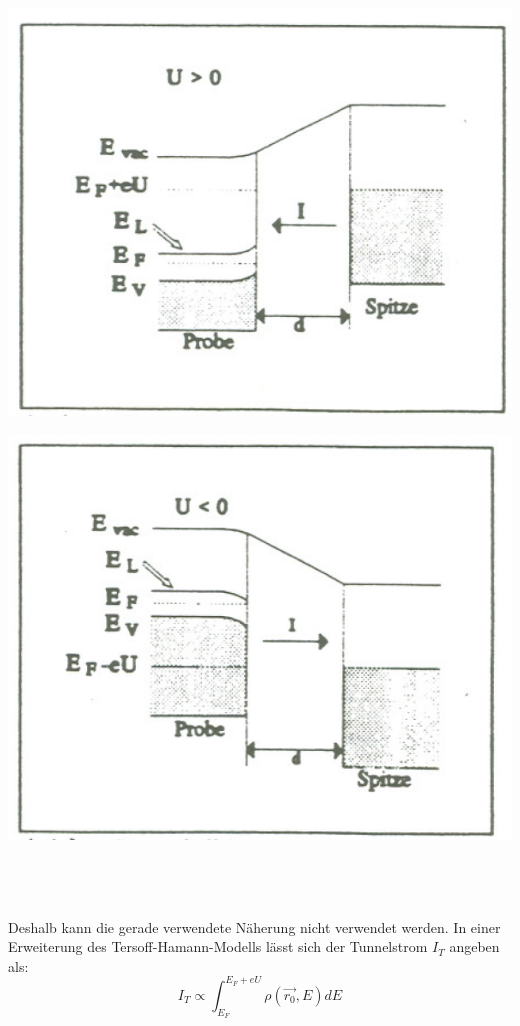\ \\
\begin{minipage}[t]{0.5\textwidth}
	\includegraphics[scale=0.75]{Bild/TunnelspannungML}
	\captionsetup{width=0.8\textwidth}
	\label{TunnelHL}
\end{minipage}
\begin{minipage}[t]{0.5\textwidth}
	\includegraphics[scale=0.75]{Bild/TunnelspannungML2}
	\captionsetup{width=0.8\textwidth}
	\label{TunnelHL2}
\end{minipage}\\
\ \\
\ \\
Deshalb kann die gerade verwendete Näherung nicht verwendet werden. 
In einer Erweiterung des Tersoff-Hamann-Modells lässt sich der Tunnelstrom
$I_T$ angeben als:
\begin{equation}
	I_T\propto\int_{E_F}^{E_F+eU}\rho(\vec{r_0},E)dE
\end{equation}
